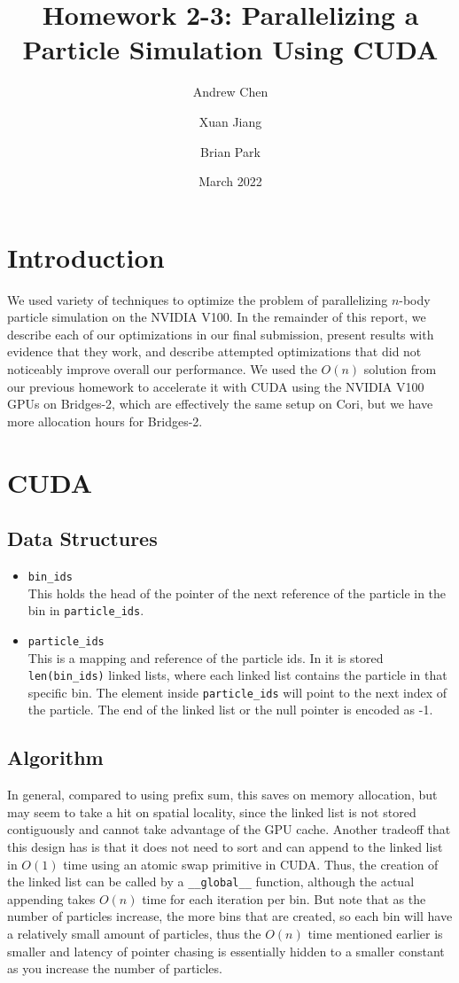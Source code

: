 \documentclass{article}
\title{Homework 2-3: Parallelizing a Particle Simulation Using CUDA}
\author{Andrew Chen}
\author{Xuan Jiang}
\author{Brian Park}
\affil{UC Berkeley, Computer Science 267}
\date{March 2022}
\begin{document}
\maketitle

\section{Introduction}
We used variety of techniques to optimize the problem of parallelizing $n$-body particle simulation on the NVIDIA V100. In the remainder of this report, we describe each of our optimizations in our final submission, present results with evidence that they work, and describe attempted optimizations that did not noticeably improve overall our performance. We used the $O(n)$ solution from our previous homework to accelerate it with CUDA using the NVIDIA V100 GPUs on Bridges-2, which are effectively the same setup on Cori, but we have more allocation hours for Bridges-2. 


\section{CUDA}
\subsection{Data Structures}
\begin{itemize}
    \item \verb|bin_ids| \\
        This holds the head of the pointer of the next reference of the particle in the bin in \verb|particle_ids|.
    \item \verb|particle_ids| \\
        This is a mapping and reference of the particle ids. In it is stored \verb|len(bin_ids)| linked lists, where each linked list contains the particle in that specific bin. The element inside \verb|particle_ids| will point to the next index of the particle. The end of the linked list or the null pointer is encoded as -1.
\end{itemize}

\subsection{Algorithm}
In general, compared to using prefix sum, this saves on memory allocation, but may seem to take a hit on spatial locality, since the linked list is not stored contiguously and cannot take advantage of the GPU cache. Another tradeoff that this design has is that it does not need to sort and can append to the linked list in $O(1)$ time using an atomic swap primitive in CUDA. Thus, the creation of the linked list can be called by a \verb|__global__| function, although the actual appending takes $O(n)$ time for each iteration per bin. But note that as the number of particles increase, the more bins that are created, so each bin will have a relatively small amount of particles, thus the $O(n)$ time mentioned earlier is smaller and latency of pointer chasing is essentially hidden to a smaller constant as you increase the number of particles. 
\end{document}

